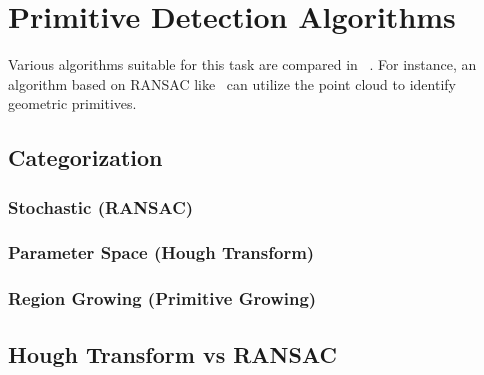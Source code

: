 \chapter{Primitive Detection Algorithms}
Various algorithms suitable for this task are compared in ~\parencite{kaiser_survey_2019}.
For instance, an algorithm based on RANSAC like~\parencite{schnabel_efficient_2007}
can utilize the point cloud to identify geometric primitives.

\section{Categorization}

\subsection{Stochastic (RANSAC)}

\subsection{Parameter Space (Hough Transform)}

\subsection{Region Growing (Primitive Growing)}

\section{Hough Transform vs RANSAC}


